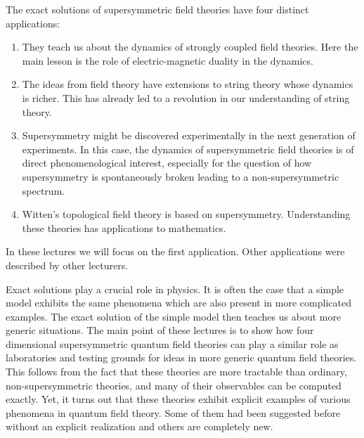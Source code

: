 \documentclass[lecture]{qft-l}
\numberwithin{figure}{chapter}
\begin{document}


\mainmatter
\setcounter{page}{1}


\LogoOnfalse



 
 
The exact solutions of supersymmetric field theories have four
distinct applications:

\medskip
\begin{enumerate}
\item They teach us about the dynamics of strongly coupled field
theories.  Here the main lesson is the role of electric-magnetic
duality in the dynamics.
\item The ideas from field theory have extensions to string theory
whose dynamics is richer.  This has already led to a revolution in our
understanding of string theory.
\item Supersymmetry might be discovered experimentally in the next
generation of experiments.  In this case, the dynamics of
supersymmetric field theories is of direct phenomenological interest,
especially for the question of how supersymmetry is spontaneously
broken leading to a non-supersymmetric spectrum.
\item Witten's topological field theory is based on supersymmetry.
Understanding these theories has applications to mathematics.
\end{enumerate}
\medskip

In these lectures we will focus on the first application.  Other
applications were described by other lecturers.

Exact solutions play a crucial role in physics.  It is often the case
that a simple model exhibits the same phenomena which are also present
in more complicated examples.  The exact solution of the simple model
then teaches us about more generic situations.  The main point of
these lectures is to show how four dimensional supersymmetric quantum
field theories can play a similar role as laboratories and testing
grounds for ideas in more generic quantum field theories. This follows
{}from the fact that these theories are more tractable than ordinary,
non-supersymmetric theories, and many of their observables can be
computed exactly.  Yet, it turns out that these theories exhibit
explicit examples of various phenomena in quantum field theory.  Some
of them had been suggested before without an explicit realization and
others are completely new.
\end{document}
